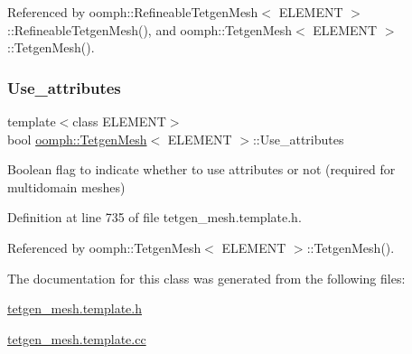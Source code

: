 Referenced by oomph\+::\+Refineable\+Tetgen\+Mesh$<$ E\+L\+E\+M\+E\+N\+T $>$\+::\+Refineable\+Tetgen\+Mesh(), and oomph\+::\+Tetgen\+Mesh$<$ E\+L\+E\+M\+E\+N\+T $>$\+::\+Tetgen\+Mesh().

\mbox{\label{classoomph_1_1TetgenMesh_a94c4ac3940ecfdd87679167d300ce75d}} 
\subsubsection{\texorpdfstring{Use\+\_\+attributes}{Use\_attributes}}
{\footnotesize\ttfamily template$<$class E\+L\+E\+M\+E\+NT$>$ \\
bool \hyperlink{classoomph_1_1TetgenMesh}{oomph\+::\+Tetgen\+Mesh}$<$ E\+L\+E\+M\+E\+NT $>$\+::Use\+\_\+attributes\hspace{0.3cm}{\ttfamily [protected]}}



Boolean flag to indicate whether to use attributes or not (required for multidomain meshes) 



Definition at line 735 of file tetgen\+\_\+mesh.\+template.\+h.



Referenced by oomph\+::\+Tetgen\+Mesh$<$ E\+L\+E\+M\+E\+N\+T $>$\+::\+Tetgen\+Mesh().



The documentation for this class was generated from the following files\+:\begin{DoxyCompactItemize}
\item 
\hyperlink{tetgen__mesh_8template_8h}{tetgen\+\_\+mesh.\+template.\+h}\item 
\hyperlink{tetgen__mesh_8template_8cc}{tetgen\+\_\+mesh.\+template.\+cc}\end{DoxyCompactItemize}
